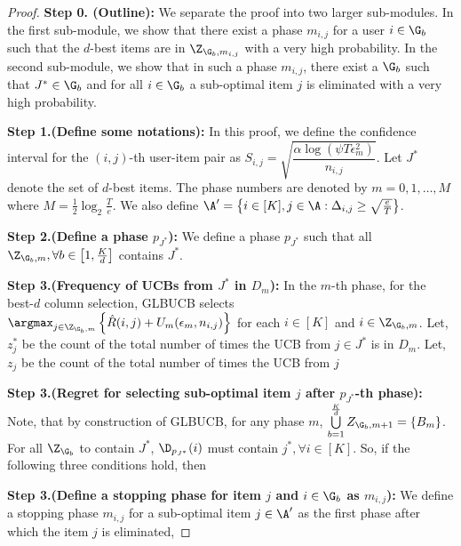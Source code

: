 \begin{proof}

\textbf{Step 0. (Outline):} We separate the proof into two larger sub-modules. In the first sub-module, we show that there exist a phase $m_{i,j}$ for a user $i\in\G_b$ such that the $d$-best items are in $\Z_{\G_b, m_{i,j}}$ with a very high probability. In the second sub-module, we show that in such a phase $m_{i,j}$, there exist a $\G_{b}$ such that $J^*\in\G_b$ and for all $i\in\G_b$ a sub-optimal item $j$ is eliminated with a very high probability.

\textbf{Step 1.(Define some notations):} In this proof,  we define the confidence interval for the $(i,j)$-th user-item pair as $S_{i,j}=\sqrt{\dfrac{\alpha\log(\psi T\epsilon_m^2)}{n_{i,j}}}$. Let $J^*$ denote the set of $d$-best items. The phase numbers are denoted by $m=0,1,\ldots,M$ where $M=\frac{1}{2}\log_{2}\frac{T}{e}$. We also define $\A'=\big\lbrace i\in[K], j\in\A: \Delta_{i,j}\geq \sqrt{\frac{e}{T}} \big\rbrace$.

\textbf{Step 2.(Define a phase $p_{J^*}$):} We define a phase $p_{J^*}$ such that all $\Z_{\G_b,m}, \forall b\in\left[ 1,\frac{K}{d}\right]$ contains $J^*$.

\textbf{Step 3.(Frequency of UCBs from $J^*$ in $D_m$):} In the $m$-th phase, for the best-$d$ column selection, GLBUCB selects $\argmax_{j\in\Z_{\G_b,m}}\left\lbrace \hat{R}(i,j)  + U_m(\epsilon_m, n_{i,j})\right\rbrace$ for each $i\in[K]$ and $i\in \Z_{\G_b,m}$. Let, $z_j^*$ be the count of the total number of times the UCB from $j\in J^*$ is in $D_m$. Let, $z_j$ be the count of the total number of times the UCB from $j$

\textbf{Step 3.(Regret for selecting sub-optimal item $j$ after  $p_{J^*}$-th phase):} Note, that by construction of GLBUCB, for any phase $m$, $\bigcup\limits_{b=1}^{\frac{K}{d}}Z_{\G_b,m+1} = \lbrace B_m\rbrace$. For all $\Z_{\G_b}$ to contain $J^*$, $\D_{p_{J^*}}(i)$ must contain $j^*,\forall i\in[K]$. So, if the following three conditions hold, then 



\textbf{Step 3.(Define a stopping phase for item $j$ and $i\in\G_b$ as  $m_{i,j}$):} We define a stopping phase $m_{i,j}$ for a sub-optimal item $j\in\A'$ as the first phase after which the item $j$ is eliminated,


\end{proof}
